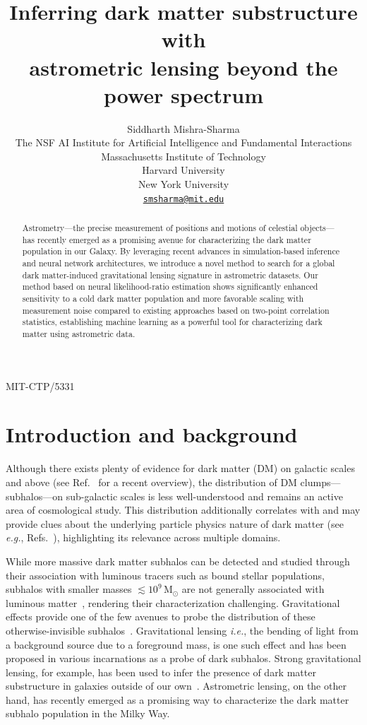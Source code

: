\documentclass[preprint]{article}
\title{Inferring dark matter substructure with \\ astrometric lensing beyond the power spectrum}
\author{
Siddharth Mishra-Sharma \\
The NSF AI Institute for Artificial Intelligence and Fundamental Interactions \\
Massachusetts Institute of Technology \\
Harvard University \\ 
New York University \\
\href{mailto:smsharma@mit.edu}{\texttt{smsharma@mit.edu}} \\
}
\begin{document}
\hfill MIT-CTP/5331
\maketitle

\begin{abstract}
Astrometry---the precise measurement of positions and motions of celestial objects---has recently emerged as a promising avenue for characterizing the dark matter population in our Galaxy. By leveraging recent advances in simulation-based inference and neural network architectures, we introduce a novel method to search for a global dark matter-induced gravitational lensing signature in astrometric datasets. Our method based on neural likelihood-ratio estimation shows significantly enhanced sensitivity to a cold dark matter population and more favorable scaling with measurement noise compared to existing approaches based on two-point correlation statistics, establishing machine learning as a powerful tool for characterizing dark matter using astrometric data. 
\end{abstract}

\section{Introduction and background}
\label{sec:intro}

Although there exists plenty of evidence for dark matter (DM) on galactic scales and above (see Ref.~\cite{Green:2021jrr} for a recent overview), the distribution of DM clumps---subhalos---on sub-galactic scales is less well-understood and remains an active area of cosmological study. This distribution additionally correlates with and may provide clues about the underlying particle physics nature of dark matter (see \emph{e.g.}, Refs.~\cite{Schutz:2020jox,Bode:2000gq,Dalcanton:2000hn}), highlighting its relevance across multiple domains.

While more massive dark matter subhalos can be detected and studied through their association with luminous tracers such as bound stellar populations, subhalos with smaller masses $\lesssim 10^9\,\mathrm M_\odot$ are not generally associated with luminous matter~\cite{Fitts:2016usl,2017MNRAS.467.2019R}, rendering their characterization challenging. Gravitational effects provide one of the few avenues to probe the distribution of these otherwise-invisible subhalos~\cite{Buckley:2017ijx}. Gravitational lensing \emph{i.e.}, the bending of light from a background source due to a foreground mass, is one such effect and has been proposed in various incarnations as a probe of dark subhalos. 
Strong gravitational lensing, for example, has been used to infer the presence of dark matter substructure in galaxies outside of our own~\cite{Hezaveh:2016ltk,Vegetti:2009cz,Gilman:2019nap,Vegetti:2012mc}.
Astrometric lensing, on the other hand, has recently emerged as a promising way to characterize the dark matter subhalo population in the Milky Way.
\end{document}
